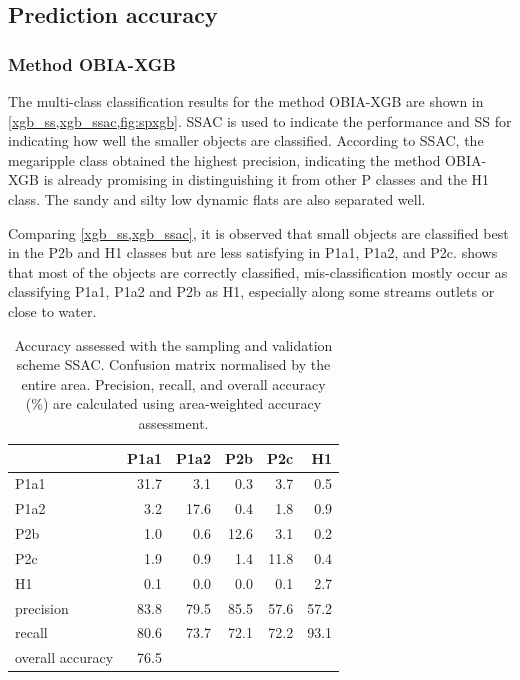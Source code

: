 \documentclass{isprs} %
\begin{document}

\subsection{Prediction accuracy}
\subsubsection{Method OBIA-XGB}
The multi-class classification results for the method OBIA-XGB are shown in \cref{xgb_ss,xgb_ssac,fig:spxgb}. SSAC is used to indicate the performance and SS for indicating how well the smaller objects are classified. According to SSAC, the megaripple class obtained the highest precision, indicating the method OBIA-XGB is already promising in distinguishing it from other P classes and the H1 class. The sandy and silty low dynamic flats are also separated well. 

Comparing \cref{xgb_ss,xgb_ssac}, it is observed that small objects are classified best in the P2b and H1 classes but are less satisfying in P1a1, P1a2, and P2c.  shows that most of the objects are correctly classified, mis-classification mostly occur as classifying P1a1, P1a2 and P2b as H1, especially along some streams outlets or close to water. 

\begin{table}[]
    \centering
\begin{tabular}{lrrrrr}
\toprule
{} &  P1a1 &  P1a2 &  P2b &  P2c &   H1 \\
\midrule
P1a1             &  31.7 &   3.1 &  0.3 &  3.7 &  0.5 \\
P1a2             &   3.2 &  17.6 &  0.4 &  1.8 &  0.9 \\
P2b              &   1.0 &   0.6 & 12.6 &  3.1 &  0.2 \\
P2c              &   1.9 &   0.9 &  1.4 & 11.8 &  0.4 \\
H1               &   0.1 &   0.0 &  0.0 &  0.1 &  2.7 \\
\midrule
precision        &  83.8 &  79.5 & 85.5 & 57.6 & 57.2 \\
recall           &  80.6 &  73.7 & 72.1 & 72.2 & 93.1 \\
overall accuracy &  76.5 &       &      &      &      \\
\bottomrule
 \end{tabular}
\caption{Accuracy assessed with the sampling and validation scheme SSAC. Confusion matrix normalised by the entire area. Precision, recall, and overall accuracy (\%) are calculated using area-weighted accuracy assessment. }
    \label{xgb_ssac}
\end{table}
\end{document}
